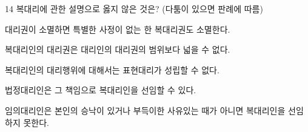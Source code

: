 \begin{question}{14}
복대리에 관한 설명으로 옳지 않은 것은? (다툼이 있으면 판례에 따름)
\begin{choices}
  \item 대리권이 소멸하면 특별한 사정이 없는 한 복대리권도 소멸한다.
  \item 복대리인의 대리권은 대리인의 대리권의 범위보다 넓을 수 없다.
  \item 복대리인의 대리행위에 대해서는 표현대리가 성립할 수 없다.
  \item 법정대리인은 그 책임으로 복대리인을 선임할 수 있다.
  \item 임의대리인은 본인의 승낙이 있거나 부득이한 사유있는 때가 아니면 복대리인을 선임하지 못한다.
\end{choices}
\end{question}
